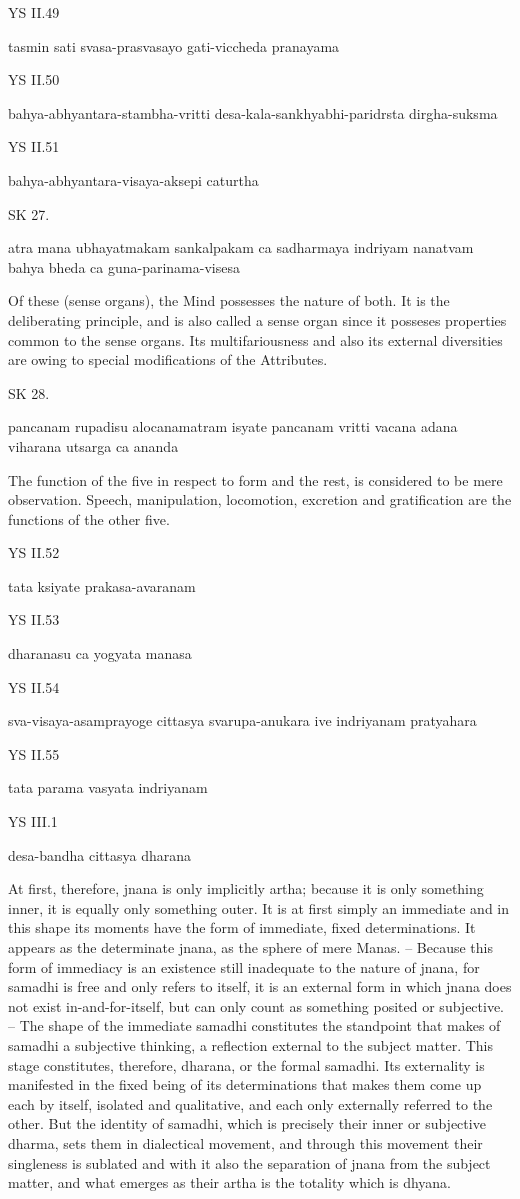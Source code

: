 YS II.49

tasmin sati svasa-prasvasayo gati-viccheda pranayama

YS II.50

bahya-abhyantara-stambha-vritti desa-kala-sankhyabhi-paridrsta dirgha-suksma

YS II.51

bahya-abhyantara-visaya-aksepi caturtha

SK 27.

atra mana ubhayatmakam sankalpakam ca sadharmaya indriyam
nanatvam bahya bheda ca guna-parinama-visesa

Of these (sense organs), the Mind possesses the nature of both.
It is the deliberating principle, and is also called a sense organ
since it posseses properties common to the sense organs.
Its multifariousness and also its external diversities are owing
to special modifications of the Attributes.

SK 28.

pancanam rupadisu alocanamatram isyate
pancanam vritti vacana adana viharana utsarga ca ananda

The function of the five in respect to form and the rest,
is considered to be mere observation.
Speech, manipulation, locomotion, excretion and gratification
are the functions of the other five.

YS II.52

tata ksiyate prakasa-avaranam

YS II.53

dharanasu ca yogyata manasa

YS II.54

sva-visaya-asamprayoge cittasya svarupa-anukara ive indriyanam pratyahara

YS II.55

tata parama vasyata indriyanam

YS III.1

desa-bandha cittasya dharana

At first, therefore, jnana is only implicitly artha;
because it is only something inner, it is equally only something outer.
It is at first simply an immediate and in this shape its moments have
the form of immediate, fixed determinations.
It appears as the determinate jnana,
as the sphere of mere Manas.
– Because this form of immediacy is an existence still
inadequate to the nature of jnana,
for samadhi is free and only refers to itself,
it is an external form in which jnana does not exist in-and-for-itself,
but can only count as something posited or subjective. –
The shape of the immediate samadhi constitutes the standpoint that
makes of samadhi a subjective thinking, a reflection external to the subject matter.
This stage constitutes, therefore, dharana, or the formal samadhi.
Its externality is manifested in the fixed being of its determinations that
makes them come up each by itself, isolated and qualitative,
and each only externally referred to the other.
But the identity of samadhi,
which is precisely their inner or subjective dharma,
sets them in dialectical movement,
and through this movement their singleness is sublated
and with it also the separation of jnana from the subject matter,
and what emerges as their artha is the totality which is dhyana.

